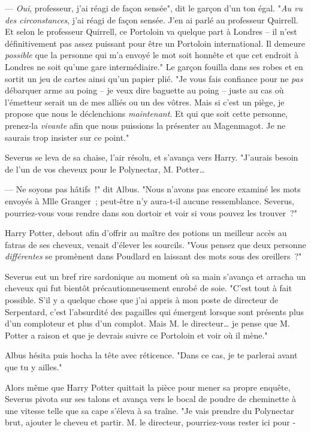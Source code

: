 --- \emph{Oui}, professeur, j'ai réagi de façon sensée", dit le garçon d'un ton égal. "\emph{Au vu des circonstances}, j'ai réagi de façon sensée. J'en ai parlé au professeur Quirrell. Et selon le professeur Quirrell, ce Portoloin va quelque part à Londres -- il n'est définitivement pas assez puissant pour être un Portoloin international. Il demeure \emph{possible} que la personne qui m'a envoyé le mot soit honnête et que cet endroit à Londres ne soit qu'une gare intermédiaire." Le garçon fouilla dans ses robes et en sortit un jeu de cartes ainsi qu'un papier plié. "Je vous fais confiance pour ne \emph{pas} débarquer arme au poing -- je veux dire baguette au poing -- juste au cas où l'émetteur serait un de mes alliés ou un des vôtres. Mais si c'est un piège, je propose que nous le déclenchions \emph{maintenant}. Et qui que soit cette personne, prenez-la \emph{vivante} afin que nous puissions la présenter au Magenmagot. Je ne saurais trop insister sur ce point."

Severus se leva de sa chaise, l'air résolu, et s'avança vers Harry. "J'aurais besoin de l'un de vos cheveux pour le Polynectar, M. Potter…

--- Ne soyons pas hâtifs~!" dit Albus. "Nous n'avons pas encore examiné les mots envoyés à Mlle Granger~; peut-être n'y aura-t-il aucune ressemblance. Severus, pourriez-vous vous rendre dans son dortoir et voir si vous pouvez les trouver~?"

Harry Potter, debout afin d'offrir au maître des potions un meilleur accès au fatras de ses cheveux, venait d'élever les sourcils. "Vous pensez que deux personne \emph{différentes} se promènent dans Poudlard en laissant des mots sous des oreillers~?"

Severus eut un bref rire sardonique au moment où sa main s'avança et arracha un cheveux qui fut bientôt précautionneusement enrobé de soie. "C'est tout à fait possible. S'il y a quelque chose que j'ai appris à mon poste de directeur de Serpentard, c'est l'absurdité des pagailles qui émergent lorsque sont présents plus d'un comploteur et plus d'un complot. Mais M. le directeur… je pense que M. Potter a raison et que je devrais suivre ce Portoloin et voir où il mène."

Albus hésita puis hocha la tête avec réticence. "Dans ce cas, je te parlerai avant que tu y ailles."

\later

Alors même que Harry Potter quittait la pièce pour mener sa propre enquête, Severus pivota sur ses talons et avança vers le bocal de poudre de cheminette à une vitesse telle que sa cape s'éleva à sa traîne. "Je vais prendre du Polynectar brut, ajouter le cheveu et partir. M. le directeur, pourriez-vous rester ici pour -

